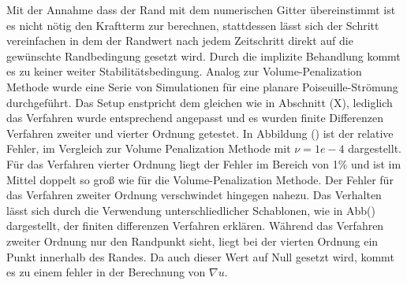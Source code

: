 Mit der Annahme dass der Rand mit dem numerischen Gitter übereinstimmt ist es nicht nötig den Kraftterm zur berechnen, stattdessen lässt sich der
Schritt vereinfachen in dem der Randwert nach  jedem Zeitschritt direkt auf die gewünschte Randbedingung gesetzt wird. Durch die
implizite Behandlung kommt es zu keiner weiter Stabilitätsbedingung.
Analog zur Volume-Penalization Methode wurde eine Serie von Simulationen für eine planare Poiseuille-Strömung durchgeführt.
Das Setup enstpricht dem gleichen wie in Abschnitt (X), lediglich das Verfahren wurde entsprechend angepasst und es wurden finite Differenzen Verfahren zweiter und
vierter Ordnung getestet.
In Abbildung () ist der relative Fehler, im Vergleich zur Volume Penalization  Methode mit $\nu=1e-4$ dargestellt.
Für das Verfahren vierter Ordnung liegt der Fehler im Bereich von 1\% und ist im Mittel doppelt so groß wie für die Volume-Penalization Methode.
Der Fehler für das Verfahren zweiter Ordnung verschwindet hingegen nahezu.
Das Verhalten lässt sich durch die Verwendung unterschliedlicher Schablonen, wie in Abb() dargestellt,  der finiten differenzen Verfahren erklären.
Während das Verfahren zweiter Ordnung nur den Randpunkt sieht, liegt bei der vierten Ordnung ein Punkt innerhalb des Randes.
Da auch dieser Wert auf Null gesetzt wird, kommt es zu einem fehler in der Berechnung von $\nabla u$.

